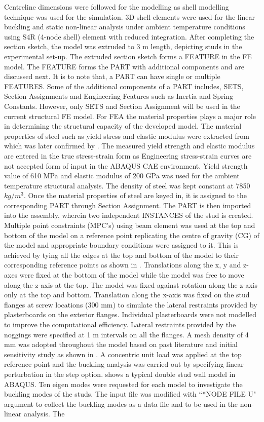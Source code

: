 Centreline dimensions were followed for the modelling as shell modelling technique was used for the simulation. 3D shell elements were used for the linear buckling and static non-linear analysis under ambient temperature conditions using S4R (4-node shell) element with reduced integration. After completing the section sketch, the model was extruded to 3 m length, depicting studs in the experimental set-up. The extruded section sketch forms a FEATURE in the FE model. The FEATURE forms the PART with additional components and are discussed next. It is to note that, a PART can have single or multiple FEATURES. Some of the additional components of a PART includes, SETS, Section Assignments and Engineering Features such as Inertia and Spring Constants. However, only SETS and Section Assignment will be used in the current structural FE model. For FEA the material properties plays a major role in determining the structural capacity of the developed model. The material properties of steel such as yield stress and elastic modulus were extracted from \citet{Kankanamge2011} which was later confirmed by \citet{Rokilan2019}. The measured yield strength and elastic modulus are entered in the true stress-strain form as Engineering stress-strain curves are not accepted form of input in the ABAQUS CAE environment. Yield strength value of 610 MPa and elastic modulus of 200 GPa was used for the ambient temperature structural analysis. The density of steel was kept constant at 7850 $kg/m^3$. Once the material properties of steel are keyed in, it is assigned to the corresponding PART through Section Assignment. The PART is then imported into the assembly, wherein two independent INSTANCES of the stud is created. Multiple point constraints (MPC's) using beam element was used at the top and bottom of the model on a reference point replicating the centre of gravity (CG) of the model and appropriate boundary conditions were assigned to it. This is achieved by tying all the edges at the top and bottom of the model to their corresponding reference points as shown in . Translations along the x, y and z-axes were fixed at the bottom of the model while the model was free to move along the z-axis at the top. The model was fixed against rotation along the z-axis only at the top and bottom. Translation along the x-axis was fixed on the stud flanges at screw locations (300 mm) to simulate the lateral restraints provided by plasterboards on the exterior flanges. Individual plasterboards were not modelled to improve the computational efficiency. Lateral restraints provided by the noggings were specified at 1 m intervals on all the flanges. A mesh density of 4 mm was adopted throughout the model based on past literature and initial sensitivity study as shown in . A concentric unit load was applied at the top reference point and the buckling analysis was carried out by specifying linear perturbation in the step option.  shows a typical double stud wall model in ABAQUS. Ten eigen modes were requested for each model to investigate the buckling modes of the studs. The input file was modified with ``*NODE FILE U" argument to collect the buckling modes as a data file and to be used in the non-linear analysis. The 